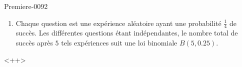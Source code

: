 
\begin{corrige}{Premiere-0092}

    \begin{enumerate}
        \item
            Chaque question est une expérience aléatoire ayant une probabilité \( \frac{1}{ 4 }\) de succès. Les différentes questions étant indépendantes, le nombre total de succès après \( 5\) tels expériences suit une loi binomiale \( B(5,0.25)\).
    \end{enumerate}
    <++>

\end{corrige}
